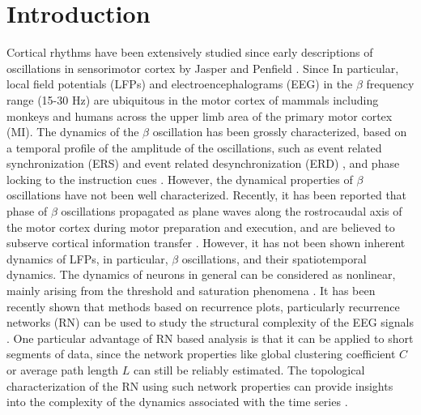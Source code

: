 \documentclass[letterpaper, 9pt, conference]{ieeeconf}
\begin{document}
\section{Introduction}
Cortical rhythms have been extensively studied since early descriptions of oscillations in sensorimotor cortex by Jasper and Penfield \cite{jasper1949}. Since In particular, local field potentials (LFPs) and electroencephalograms (EEG) in the $\beta$ frequency range (15-30 Hz) are ubiquitous in the motor cortex of mammals including monkeys and humans across the upper limb area of the primary motor cortex (MI). The dynamics of the $\beta$ oscillation has been grossly characterized, based on a temporal profile of the amplitude of the oscillations, such as event related synchronization (ERS) and event related desynchronization (ERD) \cite{neuper2001, Jurkiewicz20061281}, and phase locking to the instruction cues \cite{jake2011}. However, the dynamical properties of $\beta$ oscillations have not been well characterized. Recently, it has been reported that phase of $\beta$ oscillations propagated as plane waves along the rostrocaudal axis of the motor cortex during motor preparation and execution, and are believed to subserve cortical information transfer \cite{doug2006betawave}. However, it has not been shown inherent dynamics of LFPs, in particular, $\beta$ oscillations, and their spatiotemporal dynamics. The dynamics of neurons in general can be considered as nonlinear, mainly arising from the threshold and saturation phenomena \cite{andrzejak2001indications}. It has been recently shown that methods based on recurrence plots, particularly recurrence networks (RN) can be used to study the structural complexity of the EEG signals \cite{subramaniyam2014characterization, subramaniyam2013analysis}. One particular advantage of  RN based analysis is that it can be applied to short segments of data, since the network properties like global clustering coefficient $C$ or average path length $L$ can still be reliably estimated. The topological characterization of the RN using such network properties can provide insights into the complexity of the dynamics associated with the time series \cite{donner2010recurrence}.



\end{document}
